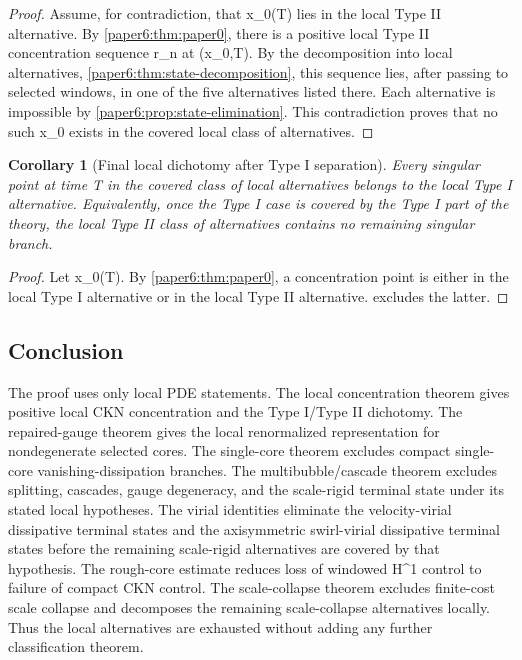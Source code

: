 \documentclass[11pt]{amsart}
\def\({}%
\def\){}%
\theoremstyle{plain}
\newtheorem{corollary}[theorem]{Corollary}
\theoremstyle{definition}
\theoremstyle{remark}
\begin{document}
\begin{proof}
Assume, for contradiction, that \(x_0\in\Sigma(T)\) lies in the local Type II
alternative.  By \cref{paper6:thm:paper0}, there is a positive local Type II
concentration sequence \(r_n\) at \((x_0,T)\).  By the decomposition into local alternatives, \cref{paper6:thm:state-decomposition}, this sequence lies,
after passing to selected windows, in one of the five alternatives listed
there.  Each alternative is impossible by \cref{paper6:prop:state-elimination}.  This
contradiction proves that no such \(x_0\) exists in the covered local
class of alternatives.
\end{proof}

\begin{corollary}[Final local dichotomy after Type I separation]
\label{paper6:cor:final-local-dichotomy}
Every singular point at time \(T\) in the covered class of local alternatives
belongs to the local Type I alternative.  Equivalently, once the Type I case is
covered by the Type I part of the theory, the local Type II class of alternatives contains no remaining singular branch.
\end{corollary}

\begin{proof}
Let \(x_0\in\Sigma(T)\).  By \cref{paper6:thm:paper0}, a concentration point is
either in the local Type I alternative or in the local Type II alternative.
 excludes the latter.
\end{proof}

\subsection{Conclusion}

The proof uses only local PDE statements.  The local concentration theorem gives
positive local CKN concentration and the Type I/Type II dichotomy.  The
repaired-gauge theorem gives the local renormalized representation for
nondegenerate selected cores.  The single-core theorem excludes compact
single-core vanishing-dissipation branches.  The multibubble/cascade theorem
excludes splitting, cascades, gauge degeneracy, and the scale-rigid terminal
state under its stated local hypotheses.  The virial identities eliminate the
velocity-virial dissipative terminal states and the axisymmetric
swirl-virial dissipative terminal states before the remaining scale-rigid
alternatives are covered by that hypothesis.  The rough-core estimate reduces
loss of windowed \(H^1\) control to failure of compact CKN control.  The
scale-collapse theorem excludes finite-cost scale collapse and decomposes the remaining scale-collapse alternatives locally.  Thus the local alternatives are exhausted without adding any further classification theorem.
\end{document}
